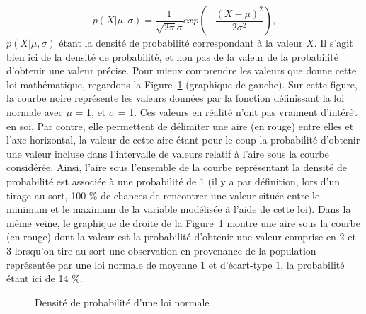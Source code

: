 \documentclass[
  letterpaper,
]{book}
\begin{document}
\[p(X | \mu, \sigma) = \frac{1}{\sqrt{2\pi}\sigma} exp(-\frac{(X-\mu)^2}{2\sigma^2}),\]
\(p(X | \mu, \sigma)\) étant la densité de probabilité correspondant à
la valeur \(X\). Il s'agit bien ici de la densité de probabilité, et non
pas de la valeur de la probabilité d'obtenir une valeur précise. Pour
mieux comprendre les valeurs que donne cette loi mathématique, regardons
la Figure~\ref{fig-distiNorm} (graphique de gauche). Sur cette figure,
la courbe noire représente les valeurs données par la fonction
définissant la loi normale avec \(\mu\) = 1, et \(\sigma\) = 1. Ces
valeurs en réalité n'ont pas vraiment d'intérêt en soi. Par contre, elle
permettent de délimiter une aire (en rouge) entre elles et l'axe
horizontal, la valeur de cette aire étant pour le coup la probabilité
d'obtenir une valeur incluse dans l'intervalle de valeurs relatif à
l'aire sous la courbe considérée. Ainsi, l'aire sous l'ensemble de la
courbe représentant la densité de probabilité est associée à une
probabilité de 1 (il y a par définition, lors d'un tirage au sort, 100
\% de chances de rencontrer une valeur située entre le minimum et le
maximum de la variable modélisée à l'aide de cette loi). Dans la même
veine, le graphique de droite de la Figure~\ref{fig-distiNorm} montre
une aire sous la courbe (en rouge) dont la valeur est la probabilité
d'obtenir une valeur comprise en 2 et 3 lorsqu'on tire au sort une
observation en provenance de la population représentée par une loi
normale de moyenne 1 et d'écart-type 1, la probabilité étant ici de 14
\%.

\begin{figure}


\caption{\label{fig-distiNorm}Densité de probabilité d'une loi normale}

\end{figure}%
\end{document}

